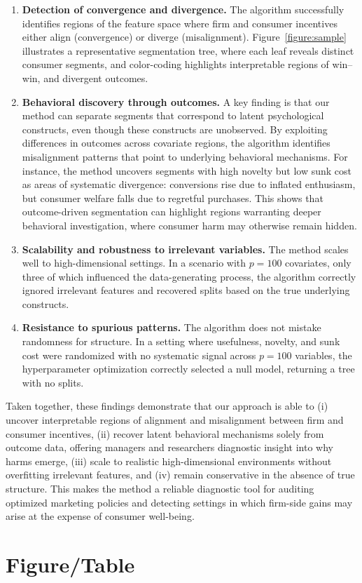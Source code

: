 \documentclass[11pt,letterpaper,english]{article}
\begin{document}
\begin{enumerate}
    \item \textbf{Detection of convergence and divergence.} The algorithm successfully identifies regions of the feature space where firm and consumer incentives either align (convergence) or diverge (misalignment). Figure~\ref{figure:sample} illustrates a representative segmentation tree, where each leaf reveals distinct consumer segments, and color-coding highlights interpretable regions of win--win, and divergent outcomes.
    
    \item \textbf{Behavioral discovery through outcomes.} A key finding is that our method can separate segments that correspond to latent psychological constructs, even though these constructs are unobserved. By exploiting differences in outcomes across covariate regions, the algorithm identifies misalignment patterns that point to underlying behavioral mechanisms. For instance, the method uncovers segments with high novelty but low sunk cost as areas of systematic divergence: conversions rise due to inflated enthusiasm, but consumer welfare falls due to regretful purchases. This shows that outcome-driven segmentation can highlight regions warranting deeper behavioral investigation, where consumer harm may otherwise remain hidden.
    
    \item \textbf{Scalability and robustness to irrelevant variables.} The method scales well to high-dimensional settings. In a scenario with $p=100$ covariates, only three of which influenced the data-generating process, the algorithm correctly ignored irrelevant features and recovered splits based on the true underlying constructs.
    
    \item \textbf{Resistance to spurious patterns.} The algorithm does not mistake randomness for structure. In a setting where usefulness, novelty, and sunk cost were randomized with no systematic signal across $p=100$ variables, the hyperparameter optimization correctly selected a null model, returning a tree with no splits.
\end{enumerate}

Taken together, these findings demonstrate that our approach is able to (i) uncover interpretable regions of alignment and misalignment between firm and consumer incentives, (ii) recover latent behavioral mechanisms solely from outcome data, offering managers and researchers diagnostic insight into why harms emerge, (iii) scale to realistic high-dimensional environments without overfitting irrelevant features, and (iv) remain conservative in the absence of true structure. This makes the method a reliable diagnostic tool for auditing optimized marketing policies and detecting settings in which firm-side gains may arise at the expense of consumer well-being.


\newpage
\section{Figure/Table}



\newpage

   
\end{document}

